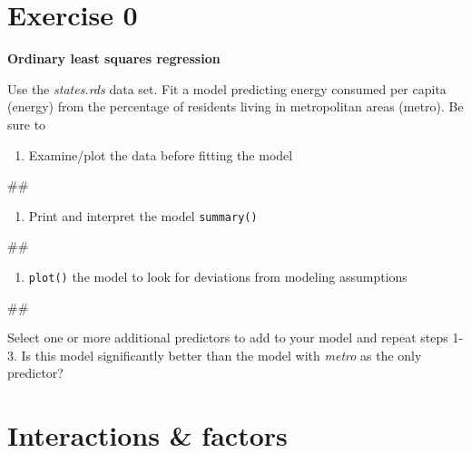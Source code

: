\documentclass[]{book}
\newenvironment{Shaded}{\begin{snugshade}}{\end{snugshade}}
\newcommand{\NormalTok}[1]{#1}
\providecommand{\tightlist}{%
  \setlength{\itemsep}{0pt}\setlength{\parskip}{0pt}}
\begin{document}
\section{Exercise 0}\label{exercise-0-1}

\textbf{Ordinary least squares regression}

Use the \emph{states.rds} data set. Fit a model predicting energy
consumed per capita (energy) from the percentage of residents living in
metropolitan areas (metro). Be sure to

\begin{enumerate}
\def\labelenumi{\arabic{enumi}.}
\tightlist
\item
  Examine/plot the data before fitting the model
\end{enumerate}

\begin{Shaded}
\begin{Highlighting}[]
\NormalTok{## }
\end{Highlighting}
\end{Shaded}

\begin{enumerate}
\def\labelenumi{\arabic{enumi}.}
\setcounter{enumi}{1}
\tightlist
\item
  Print and interpret the model \texttt{summary()}
\end{enumerate}

\begin{Shaded}
\begin{Highlighting}[]
\NormalTok{## }
\end{Highlighting}
\end{Shaded}

\begin{enumerate}
\def\labelenumi{\arabic{enumi}.}
\setcounter{enumi}{2}
\tightlist
\item
  \texttt{plot()} the model to look for deviations from modeling
  assumptions
\end{enumerate}

\begin{Shaded}
\begin{Highlighting}[]
\NormalTok{## }
\end{Highlighting}
\end{Shaded}

Select one or more additional predictors to add to your model and repeat
steps 1-3. Is this model significantly better than the model with
\emph{metro} as the only predictor?

\section{Interactions \& factors}\label{interactions-factors}
\end{document}
